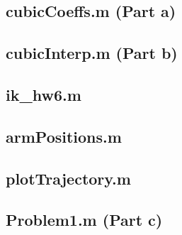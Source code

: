 \documentclass[11pt]{article}
\begin{document}
\subsection*{cubicCoeffs.m (Part a)}\label{app:code:cubicCoeffs}

\subsection*{cubicInterp.m (Part b)}\label{app:code:cubicInterp}

\subsection*{ik\_hw6.m}\label{app:code:ik}

\subsection*{armPositions.m}\label{app:code:armPositions}

\subsection*{plotTrajectory.m}\label{app:code:plotTrajectory}

\subsection*{Problem1.m (Part c)}\label{app:code:problem1}

\newpage

\end{document}
